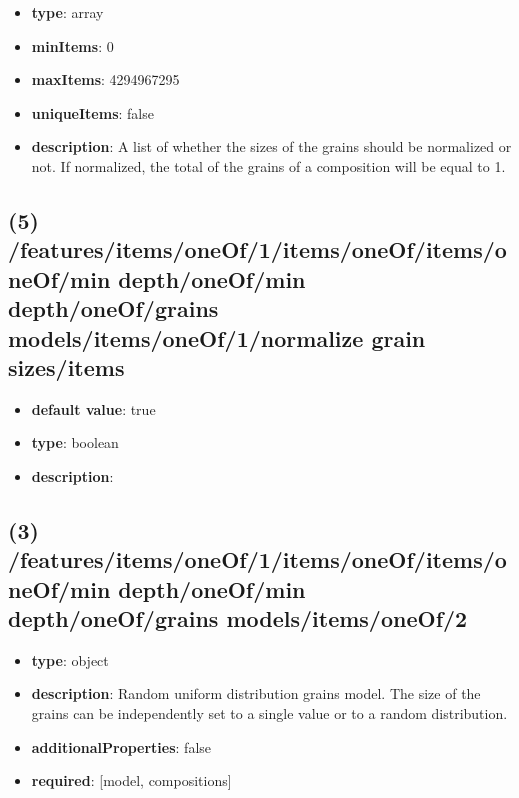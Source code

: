 \begin{itemize}[leftmargin=4em]\item {\bf type}: array
\item {\bf minItems}: 0
\item {\bf maxItems}: 4294967295
\item {\bf uniqueItems}: false
\item {\bf description}: A list of whether the sizes of the grains should be normalized or not. If normalized, the total of the grains of a composition will be equal to 1.
\end{itemize}\subsection{(5) /features/items/oneOf/1/items/oneOf/items/oneOf/min depth/oneOf/min depth/oneOf/grains models/items/oneOf/1/normalize grain sizes/items}
\begin{itemize}[leftmargin=5em]\item {\bf default value}: true
\item {\bf type}: boolean
\item {\bf description}: 
\end{itemize}\subsection{(3) /features/items/oneOf/1/items/oneOf/items/oneOf/min depth/oneOf/min depth/oneOf/grains models/items/oneOf/2}
\begin{itemize}[leftmargin=3em]\item {\bf type}: object
\item {\bf description}: Random uniform distribution grains model. The size of the grains can be independently set to a single value or to a random distribution.
\item {\bf additionalProperties}: false
\item {\bf required}: [model, compositions]\end{itemize}

